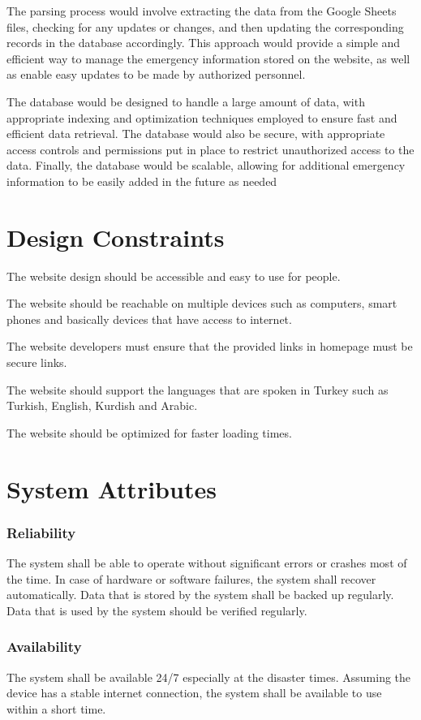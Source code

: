 \documentclass[12pt]{report}
\begin{document}
The parsing process would involve extracting the data from the Google Sheets files, checking for any updates or changes, and then updating the corresponding records in the database accordingly. This approach would provide a simple and efficient way to manage the emergency information stored on the website, as well as enable easy updates to be made by authorized personnel.

The database would be designed to handle a large amount of data, with appropriate indexing and optimization techniques employed to ensure fast and efficient data retrieval. The database would also be secure, with appropriate access controls and permissions put in place to restrict unauthorized access to the data. Finally, the database would be scalable, allowing for additional emergency information to be easily added in the future as needed

\section{Design Constraints}
The website design should be accessible and easy to use for people.

The website should be reachable on multiple devices such as computers, smart phones and basically devices that have access to internet.

The website developers must ensure that the provided links in homepage must be secure links.

The website should support the languages that are spoken in Turkey such as Turkish, English, Kurdish and Arabic.

The website should be optimized for faster loading times.

\section{System Attributes}
\subsubsection{Reliability}
The system shall be able to operate without significant errors or crashes most of the time.
In case of hardware or software failures, the system shall recover automatically.
Data that is stored by the system shall be backed up regularly.
Data that is used by the system should be verified regularly.

\subsubsection{Availability}
The system shall be available 24/7 especially at the disaster times. 
Assuming the device has a stable internet connection, the system shall be available to use within a short time.
\end{document}
